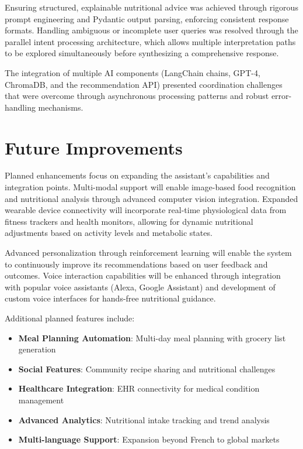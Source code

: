 Ensuring structured, explainable nutritional advice was achieved through rigorous prompt engineering and Pydantic output parsing, enforcing consistent response formats. Handling ambiguous or incomplete user queries was resolved through the parallel intent processing architecture, which allows multiple interpretation paths to be explored simultaneously before synthesizing a comprehensive response.

The integration of multiple AI components (LangChain chains, GPT-4, ChromaDB, and the recommendation API) presented coordination challenges that were overcome through asynchronous processing patterns and robust error-handling mechanisms.

\section{Future Improvements}
Planned enhancements focus on expanding the assistant's capabilities and integration points. Multi-modal support will enable image-based food recognition and nutritional analysis through advanced computer vision integration. Expanded wearable device connectivity will incorporate real-time physiological data from fitness trackers and health monitors, allowing for dynamic nutritional adjustments based on activity levels and metabolic states.

Advanced personalization through reinforcement learning will enable the system to continuously improve its recommendations based on user feedback and outcomes. Voice interaction capabilities will be enhanced through integration with popular voice assistants (Alexa, Google Assistant) and development of custom voice interfaces for hands-free nutritional guidance.

Additional planned features include:
\begin{itemize}
\item \textbf{Meal Planning Automation}: Multi-day meal planning with grocery list generation
\item \textbf{Social Features}: Community recipe sharing and nutritional challenges
\item \textbf{Healthcare Integration}: EHR connectivity for medical condition management
\item \textbf{Advanced Analytics}: Nutritional intake tracking and trend analysis
\item \textbf{Multi-language Support}: Expansion beyond French to global markets
\end{itemize}


